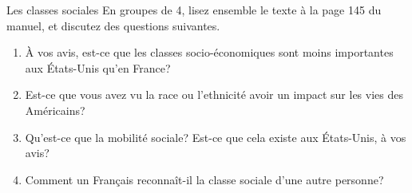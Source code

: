 \begin{frame}{Les classes sociales}
  En groupes de 4, lisez ensemble le texte à la page 145 du manuel, et discutez des questions suivantes.
  \begin{enumerate}
    \item À vos avis, est-ce que les classes socio-économiques sont moins importantes aux États-Unis qu'en France?
    \item Est-ce que vous avez vu la race ou l'ethnicité avoir un impact sur les vies des Américains?
    \item Qu'est-ce que la mobilité sociale? Est-ce que cela existe aux États-Unis, à vos avis?
    \item Comment un Français reconnaît-il la classe sociale d'une autre personne?
  \end{enumerate}
\end{frame}